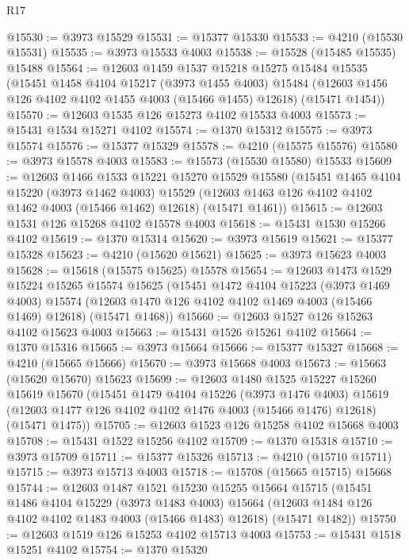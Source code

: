 \begin{lexlean}{R17}
\begin{coremodule}
@15530 := @3973 @15529
@15531 := @15377 @15330
@15533 := @4210 (@15530 @15531)
@15535 := @3973 @15533 @4003
@15538 := @15528 (@15485 @15535) @15488
@15564 := @12603
    @1459
    @1537
    @15218
    @15275
    @15484
    @15535
    (@15451
      @1458
      @4104
      @15217
      (@3973 @1455 @4003)
      @15484
      (@12603 @1456 @126 @4102 @4102 @1455 @4003 (@15466 @1455) @12618)
      (@15471 @1454))
@15570 := @12603 @1535 @126 @15273 @4102 @15533 @4003
@15573 := @15431 @1534 @15271 @4102
@15574 := @1370 @15312
@15575 := @3973 @15574
@15576 := @15377 @15329
@15578 := @4210 (@15575 @15576)
@15580 := @3973 @15578 @4003
@15583 := @15573 (@15530 @15580) @15533
@15609 := @12603
    @1466
    @1533
    @15221
    @15270
    @15529
    @15580
    (@15451
      @1465
      @4104
      @15220
      (@3973 @1462 @4003)
      @15529
      (@12603 @1463 @126 @4102 @4102 @1462 @4003 (@15466 @1462) @12618)
      (@15471 @1461))
@15615 := @12603 @1531 @126 @15268 @4102 @15578 @4003
@15618 := @15431 @1530 @15266 @4102
@15619 := @1370 @15314
@15620 := @3973 @15619
@15621 := @15377 @15328
@15623 := @4210 (@15620 @15621)
@15625 := @3973 @15623 @4003
@15628 := @15618 (@15575 @15625) @15578
@15654 := @12603
    @1473
    @1529
    @15224
    @15265
    @15574
    @15625
    (@15451
      @1472
      @4104
      @15223
      (@3973 @1469 @4003)
      @15574
      (@12603 @1470 @126 @4102 @4102 @1469 @4003 (@15466 @1469) @12618)
      (@15471 @1468))
@15660 := @12603 @1527 @126 @15263 @4102 @15623 @4003
@15663 := @15431 @1526 @15261 @4102
@15664 := @1370 @15316
@15665 := @3973 @15664
@15666 := @15377 @15327
@15668 := @4210 (@15665 @15666)
@15670 := @3973 @15668 @4003
@15673 := @15663 (@15620 @15670) @15623
@15699 := @12603
    @1480
    @1525
    @15227
    @15260
    @15619
    @15670
    (@15451
      @1479
      @4104
      @15226
      (@3973 @1476 @4003)
      @15619
      (@12603 @1477 @126 @4102 @4102 @1476 @4003 (@15466 @1476) @12618)
      (@15471 @1475))
@15705 := @12603 @1523 @126 @15258 @4102 @15668 @4003
@15708 := @15431 @1522 @15256 @4102
@15709 := @1370 @15318
@15710 := @3973 @15709
@15711 := @15377 @15326
@15713 := @4210 (@15710 @15711)
@15715 := @3973 @15713 @4003
@15718 := @15708 (@15665 @15715) @15668
@15744 := @12603
    @1487
    @1521
    @15230
    @15255
    @15664
    @15715
    (@15451
      @1486
      @4104
      @15229
      (@3973 @1483 @4003)
      @15664
      (@12603 @1484 @126 @4102 @4102 @1483 @4003 (@15466 @1483) @12618)
      (@15471 @1482))
@15750 := @12603 @1519 @126 @15253 @4102 @15713 @4003
@15753 := @15431 @1518 @15251 @4102
@15754 := @1370 @15320

\end{coremodule}
\end{lexlean}
